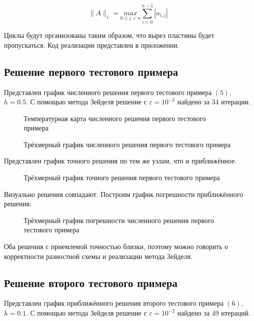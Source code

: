 \documentclass[a4paper, 12pt]{article} %
\begin{document}
\[ \| A \|_1 = \underset{0 \leq j < n}{max} \sum_{i = 0}^{n - 1} |a_{i, j}| \]

Циклы будут организованы таким образом, что вырез пластины будет пропускаться. Код реализации представлен в приложении.

\subsection{Решение первого тестового примера}

Представлен график численного решения первого тестового примера $ (5) $, $ h = 0.5 $. С помощью метода Зейделя решение с $ \varepsilon = 10^{-2} $ найдено за 34 итерации.

\begin{figure}[h]
\caption{Температурная карта численного решения первого тестового примера}
\end{figure}

\begin{figure}[h]
\caption{Трёхмерный график численного решения первого тестового примера}
\end{figure}

\newpage

Представлен график точного решения по тем же узлам, что и приближённое.

\begin{figure}[h]
\caption{Трёхмерный график точного решения первого тестового примера}
\end{figure}

Визуально решения совпадают. Построим график погрешности приближённого решения:

\newpage

\begin{figure}[h]
\caption{Трёхмерный график погрешности численного решения первого тестового примера}
\end{figure}

Оба решения с приемлемой точностью близки, поэтому можно говорить о корректности разностной схемы и реализации метода Зейделя.

\subsection{Решение второго тестового примера}

Представлен график приближённого решения второго тестового примера $ (6) $, $ h = 0.1 $. С помощью метода Зейделя решение с $ \varepsilon = 10^{-2} $ найдено за 49 итераций.
\end{document}
